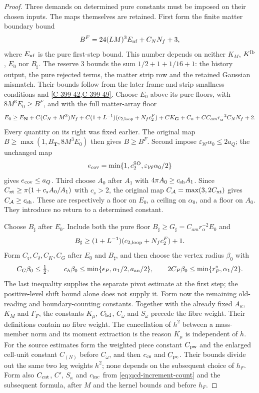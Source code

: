 \documentclass[11pt,letterpaper,reqno]{amsart}
\theoremstyle{definition}
\theoremstyle{remark}
\begin{document}
\begin{proof}
Three demands on determined pure constants must be imposed
on their chosen inputs. The maps themselves are retained.
First form the finite matter boundary bound
\[
 B^F=24(LM)^3E_{\rm nf}+C_NN_f+3,
\]
where $E_{\rm nf}$ is the pure first-step bound.
This number depends on neither $K_M$, $K^{\rm lb}$, $E_0$
nor $B_\sharp$. The reserve $3$ bounds the sum
$1/2+1+1/16+1$: the history output, the pure rejected
terms, the matter strip row and the retained Gaussian mismatch.
Their bounds follow from the later frame and strip smallness
conditions and \cref{C-399-42,C-399-49}. Choose $E_0$ above
its pure floors, with $8M^3E_0\ge B^F$, and with the full
matter-array floor
\[
 E_0\ge E_{\mathbf N}+C(C_N+M^3)N_f
 +C(1+L^{-1})(c_{2,\rm loop}+N_fc_2^F)
 +CK_{\mathbf G}+C_n+C C_{am}r_\alpha^{-2}C_NN_f+2.
\]
Every quantity on its right was fixed earlier.
The original map $B\ge\max(1,B_{\mathbf T},8M^3E_0)$ then
gives $B\ge B^F$. Second impose
$\varepsilon_{\mathcal W}\alpha_0\le2a_Q$; the unchanged map
\[
 e_{\rm cov}=\min\{1,c_2^{\rm SO},
                         \varepsilon_{\mathcal W}\alpha_0/2\}
\]
gives $e_{\rm cov}\le a_Q$.
Third choose $A_0$ after $A_1$ with
$4\pi A_0\ge c_{\rm sh}A_1$.
Since $C_{\rm xt}\ge\pi(1+c_sA_0/A_1)$ with $c_s>2$,
the original map $C_{\mathcal A}=\max(3,2C_{\rm xt})$
gives $C_{\mathcal A}\ge c_{\rm sh}$.
These are respectively a floor on $E_0$, a ceiling on
$\alpha_0$, and a floor on $A_0$. They introduce no return
to a determined constant.

Choose $B_\sharp$ after $E_0$. Include both the pure floor
$B_\sharp\ge G_\sharp=C_{am}r_\alpha^{-2}E_0$ and
\[
 B_\sharp\ge(1+L^{-1})(c_{2,\rm loop}+N_fc_2^F)+1.
\]
Form $C_{\mathfrak r},C_\delta,C_K,C_G$ after $E_0$ and
$B_\sharp$, and then choose the vertex radius $\beta_0$ with
\[
 C_G\beta_0\le\tfrac12,\qquad
 c_h\beta_0\le\min\{\epsilon_P,\alpha_1/2,a_{\rm an}/2\},
 \qquad 2C_P\beta_0\le\min\{r_P^\circ,\alpha_1/2\}.
\]
The last inequality supplies the separate pivot estimate at
the first step; the positive-level shift bound alone does
not supply it.
Form now the remaining old-reading and boundary-counting
constants. Together with the already fixed $A_\kappa$,
$K_M$ and $\Gamma_F$, the constants $K_\mu$, $C_{\rm bd}$,
$C_\omega$ and $S_\omega$ precede the fibre weight.
Their definitions contain no fibre weight. The cancellation of
$h^2$ between a mass-member norm and its moment extraction
is the reason $K_\mu$ is independent of $h$.
For the source estimates form the weighted piece constant
$C_{\rm pw}$ and the enlarged cell-unit constant $C_{(N)}$
before $C_\omega$, and then $c_{\rm cs}$ and $C_{\rm pc}$.
Their bounds divide out the same two leg weights $h^2$;
none depends on the subsequent choice of $h_F$.
Form also $C_{\rm cnt}$, $C'$, $S_\kappa$ and $c_{\rm inc}$
from \eqref{eq:qcd-increment-count} and the subsequent formula,
after $M$ and the kernel bounds and before $h_F$.


\end{proof}
\end{document}

